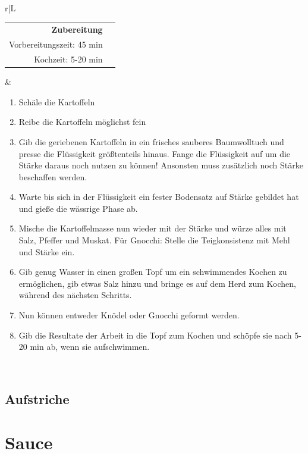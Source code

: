 \documentclass[a4paper, 12pt]{scrbook} 								%
\numberwithin{equation}{section} 									%
\begin{document}
		\newpage
		\begin{tabularx}{\textwidth}{r|L}
	
	
		\begin{tabular}[t]{rr}
			\textbf{Zubereitung}	\\
			\small Vorbereitungszeit: 45 min	\\
			\small Kochzeit:	5-20 min		\\
		\end{tabular}			&	\begin{enumerate}[]
										\item Schäle die Kartoffeln
										\item Reibe die Kartoffeln möglichst fein
										\item Gib die geriebenen Kartoffeln in ein frisches sauberes Baumwolltuch und presse die Flüssigkeit größtenteils hinaus. Fange die Flüssigkeit auf um die Stärke daraus noch nutzen zu können! Ansonsten muss zusätzlich noch Stärke beschaffen werden.
										\item Warte bis sich in der Flüssigkeit ein fester Bodensatz auf Stärke gebildet hat und gieße die wässrige Phase ab.
										\item Mische die Kartoffelmasse nun wieder mit der Stärke und würze alles mit Salz, Pfeffer und Muskat. Für Gnocchi: Stelle die Teigkonsistenz mit Mehl und Stärke ein.
										\item Gib genug Wasser in einen großen Topf um ein schwimmendes Kochen zu ermöglichen, gib etwas Salz hinzu und bringe es auf dem Herd zum Kochen, während des nächsten Schritts.
										\item Nun können entweder Knödel oder Gnocchi geformt werden.
										\item Gib die Resultate der Arbeit in die Topf zum Kochen und schöpfe sie nach 5-20 min ab, wenn sie aufschwimmen.  
									\end{enumerate}	\\
	\end{tabularx}
	\newpage


	\section{Aufstriche}


\chapter{Sauce}
\end{document}
